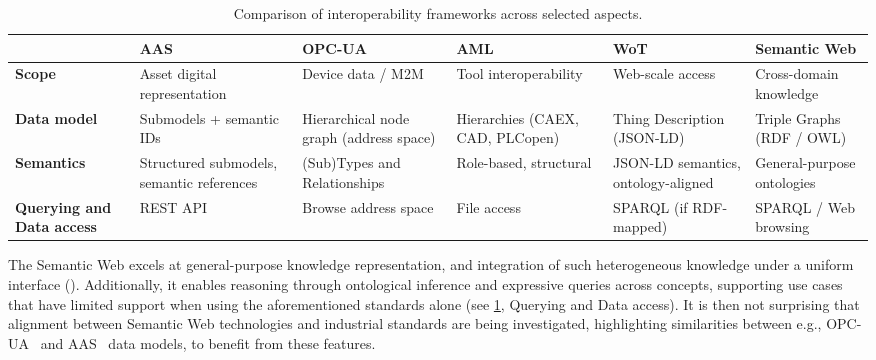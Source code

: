 \begin{table}
    \centering
    \small
    \setlength{\tabcolsep}{3pt} %
    \renewcommand{\arraystretch}{1.3} %
   \begin{tabular}{>{\raggedright\arraybackslash}p{2cm}|>{\raggedright\arraybackslash}p{2.2cm}|>{\raggedright\arraybackslash}p{2.2cm}|>{\raggedright\arraybackslash}p{2.2cm}|>{\raggedright\arraybackslash}p{2.2cm}|>{\raggedright\arraybackslash}p{2.2cm}}
    \toprule
    \midrule
    \textbf{} & \textbf{AAS} & \textbf{OPC-UA} & \textbf{AML} & \textbf{WoT} & \textbf{Semantic Web} \\
    \hline
    \hline
    \textbf{Scope} &
    Asset digital representation &
    Device data / \ac{M2M} &
    Tool interoperability &
    Web-scale access &
    Cross-domain knowledge \\
    \hline
    \textbf{Data model} &
    Submodels + semantic IDs &
    Hierarchical node graph (address space) &
    Hierarchies (CAEX, CAD, PLCopen) &
    Thing Description (JSON-LD) &
    Triple Graphs (RDF / OWL) \\
    \hline
    \textbf{Semantics} &
    Structured submodels, semantic references &
    (Sub)Types and Relationships &
    Role-based, structural  &
    JSON-LD semantics, ontology-aligned &
    General-purpose ontologies \\
    \hline
    \textbf{Querying and Data access} &
    REST API &
    Browse address space &
    File access &
    SPARQL (if RDF-mapped) &
    SPARQL / Web browsing \\
    \hline
    \bottomrule
    \end{tabular}
    \caption{Comparison of interoperability frameworks across selected aspects.}
    \label{tab:interop_comparison}
\end{table}


The Semantic Web excels at general-purpose knowledge representation, and integration of such heterogeneous knowledge under a uniform interface ().
%
Additionally, it enables reasoning through ontological inference and expressive queries across concepts, supporting use cases that have limited support when using the aforementioned standards alone (see \cref{tab:interop_comparison}, Querying and Data access).
%
It is then not surprising that alignment between Semantic Web technologies and industrial standards are being investigated, highlighting similarities between e.g., \ac{OPC-UA}~\cite{DBLP:conf/etfa/MajumderWD19,DBLP:conf/etfa/PerzyloP0K19} and \ac{AAS}~\cite{DBLP:conf/icphys/BedenCB21, platform_i40_aas_part1_v2} data models, to benefit from these features.

